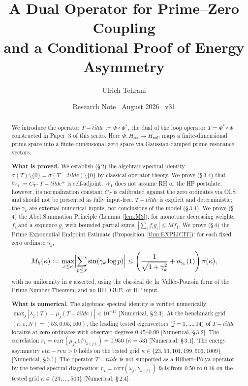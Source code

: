 \documentclass[11pt]{article}
\title{\vspace{-1.5em}\bfseries A Dual Operator for Prime--Zero Coupling\\[0.4em]
\large and a Conditional Proof of Energy Asymmetry}
\author{Ulrich Tehrani}
\date{Research Note \textperiodcentered\ August 2026 \textperiodcentered\ v31}
\def\Tt{T-tilde}%
\def\etaren{eta-ren}%
\newcommand{\Hstr}{H_{\mathrm{str}}}
\newcommand{\Hnull}{H_{\mathrm{null}}}
\newcommand{\etaren}{\eta_{\mathrm{ren}}}
\newcommand{\Tt}{\widetilde{T}}
\newcommand{\CT}{C_{T}}
\newcommand{\Wone}{W_1}
\begin{document}
\maketitle

\begin{abstract}
We introduce the operator $\Tt := \Phi \circ \Phi^*$,
the dual of the loop operator $T = \Phi^* \circ \Phi$ constructed in Paper~3
of this series. Here $\Phi\colon\Hstr \to \Hnull$ maps a
finite-dimensional prime space into a finite-dimensional zero space via
Gaussian-damped prime resonance vectors.

\textbf{What is proved.}
We establish (\S\,2) the algebraic spectral identity
$\sigma(T)\setminus\{0\} = \sigma(\Tt)\setminus\{0\}$
by classical operator theory.
We prove (\S\,3.4) that $\Wone := \CT\cdot\Tt^+$ is self-adjoint.
$\Wone$ does not assume RH or the HP postulate; however, its normalization
constant $\CT$ is calibrated against the zero ordinates via OLS and should
not be presented as fully input-free.
$\Tt$ is explicit and deterministic; the $\gamma_k$ are external numerical
inputs, not conclusions of the model (\S\,3.4).
We prove (\S\,4) the Abel Summation Principle (Lemma~\ref{lem:M3}):
for monotone decreasing weights $f_i$ and a sequence $g_i$ with bounded
partial sums, $|\sum_i f_i g_i| \leq M f_1$.
We prove (\S\,4) the Prime Exponential Endpoint Estimate
(Proposition~\ref{thm:EXPLICIT}): for each fixed zero ordinate $\gamma_k$,
\[
M_k(\kappa) := \max_{x \leq \kappa}\Bigl|\sum_{p \leq x}\sin(\gamma_k\log p)\Bigr|
\le \left(\frac{1}{\sqrt{1+\gamma_k^2}}+o_{\gamma_k}(1)\right)\pi(\kappa),
\]
with no uniformity in $k$ asserted,
using the classical de~la~Vall\'ee-Poussin form of the Prime Number Theorem,
and no RH, GUE, or HP input.

\textbf{What is numerical.}
The algebraic spectral identity is verified numerically:
$\max_j|\lambda_j(T)-\mu_j(\Tt)|<10^{-15}$ [Numerical, \S\,2.3].
At the benchmark grid $(\kappa,\varepsilon,N)=(53,0.05,100)$, the
leading tested eigenvectors ($j=1,\ldots,14$) of $\Tt$ localize at
zero ordinates with observed degrees $0.45$--$0.99$ [Numerical, \S\,3.2].
The correlation $r_1 = \mathrm{corr}(\mu_j,1/\gamma_{k(j)}) = 0.950$
($\kappa=53$) [Numerical, \S\,3.1].
The energy asymmetry $\etaren > 0$ holds on the tested grid
$\kappa\in\{23,53,101,199,503,1009\}$
[Numerical, \S\,5.1].
The operator $\Tt$ is not supported as a Hilbert--P\'olya operator
by the tested spectral diagnostics: $r_2 = \mathrm{corr}(\omega_j,\gamma_{k(j)})$
falls from $0.50$ to $0.16$ on the tested grid
$\kappa\in\{23,\ldots,503\}$ [Numerical, \S\,2.4].


\end{abstract}
\end{document}
